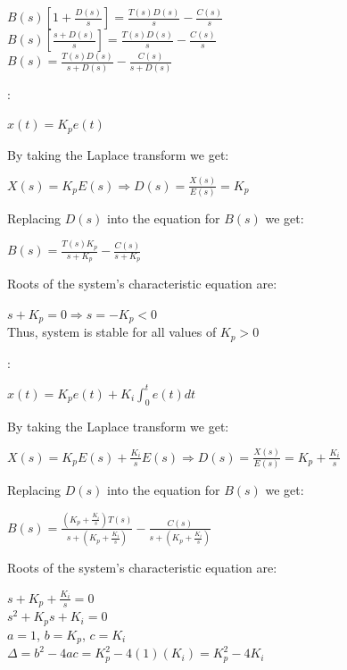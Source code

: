 \documentclass{article}
\begin{document}
\begin{enumerate}
\begin{itemize}
\noindent $B(s)[1 + {\frac{D(s)}{s}}] = {\frac{T(s) D(s)}{s}} -
{\frac{C(s)}{s}}$\\

\noindent $B(s)[{\frac{s + D(s)}{s}}] = {\frac{T(s) D(s)}{s}} -
{\frac{C(s)}{s}}$\\

\noindent $B(s) = {\frac{T(s) D(s)}{s + D(s)}} - {\frac{C(s)}{s +
D(s)}}$

\bigbreak \bigbreak

: \smallbreak

\noindent $x(t) = K_p e(t)$ \bigbreak

\noindent By taking the Laplace transform we get: \smallbreak

\noindent $X(s) = K_p E(s) \Rightarrow D(s) = {\frac{X(s)}{E(s)}}
= K_p$ \bigbreak

\noindent Replacing $D(s)$ into the equation for $B(s)$ we get:
\smallbreak

\noindent $B(s) = {\frac{T(s) K_p}{s + K_p}} - {\frac{C(s)}{s +
K_p}}$ \bigbreak

\noindent Roots of the system's characteristic equation are:
\smallbreak

\noindent $s + K_p = 0 \Rightarrow s = -K_p < 0$\\
\noindent Thus, system is stable for all values of $K_p > 0$

\bigbreak \bigbreak

: \smallbreak

\noindent $x(t) = K_p e(t) + K_i \int^t_0 e(t) dt$ \bigbreak

\noindent By taking the Laplace transform we get: \smallbreak

\noindent $X(s) = K_p E(s) + {\frac{K_i}{s}} E(s) \Rightarrow D(s)
= {\frac{X(s)}{E(s)}} = K_p + {\frac{K_i}{s}}$ \bigbreak

\noindent Replacing $D(s)$ into the equation for $B(s)$ we get:
\smallbreak

\noindent $B(s) = {\frac{(K_p + {\frac{K_i}{s}}) T(s)}{s + (K_p +
{\frac{K_i}{s}})}} - {\frac{C(s)}{s + (K_p + {\frac{K_i}{s}})}}$
\bigbreak

\noindent Roots of the system's characteristic equation are:
\smallbreak

\noindent $s + K_p + {\frac{K_i}{s}} = 0$\\
\noindent $s^2 + K_ps + K_i = 0$\\
\noindent $a = 1$, $b = K_p$, $c = K_i$\\
\noindent $\Delta = b^2 - 4ac = K_p^2 - 4(1)(K_i) = K_p^2 - 4 K_i$
\bigbreak


\end{itemize}
\end{enumerate}
\end{document}
